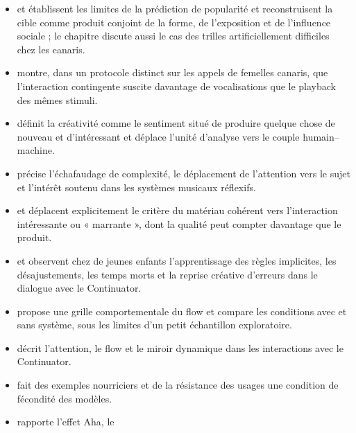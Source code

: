 \documentclass[11pt,a4paper]{article}
\begin{document}
\begin{itemize}
        de son utilité et situe un effet Aha dans la contradiction entre
        similarité timbrale et attente textuelle.
  \item \textcite{pachetroy2008hitsong} et \textcite{pachet2011hitsong}
        établissent les limites de la prédiction de popularité et reconstruisent
        la cible comme produit conjoint de la forme, de l'exposition et de
        l'influence sociale ; le chapitre discute aussi le cas des trilles
        artificiellement difficiles chez les canaris.
  \item \textcite{lerch2011closedloop} montre, dans un protocole distinct sur les
        appels de femelles canaris, que l'interaction contingente suscite davantage
        de vocalisations que le playback des mêmes stimuli.
  \item \textcite{pachet2006creativity} définit la créativité comme le sentiment
        situé de produire quelque chose de nouveau et d'intéressant et déplace
        l'unité d'analyse vers le couple humain--machine.
  \item \textcite{pachet2006reflective} précise l'échafaudage de complexité, le
        déplacement de l'attention vers le sujet et l'intérêt soutenu dans les
        systèmes musicaux réflexifs.
  \item \textcite{pachet2004cybernetic} et
        \textcite{pachet2006interactionsreflexives} déplacent explicitement le
        critère du matériau cohérent vers l'interaction intéressante ou
        « marrante », dont la qualité peut compter davantage que le produit.
  \item \textcite{pachet2004childrenreflect} et
        \textcite{addessi2005experiments} observent chez de jeunes enfants
        l'apprentissage des règles implicites, les désajustements, les temps morts
        et la reprise créative d'erreurs dans le dialogue avec le Continuator.
  \item \textcite{addessi2006flowmachine} propose une grille comportementale du
        flow et compare les conditions avec et sans système, sous les limites d'un
        petit échantillon exploratoire.
  \item \textcite{pachet2004flowmachines} décrit l'attention, le flow et le miroir
        dynamique dans les interactions avec le Continuator.
  \item \textcite{pachet2004reification} fait des exemples nourriciers et de la
        résistance des usages une condition de fécondité des modèles.
  \item \textcite{pachet2002continuatorinteraction} rapporte l'effet Aha, le

\end{itemize}
\end{document}
